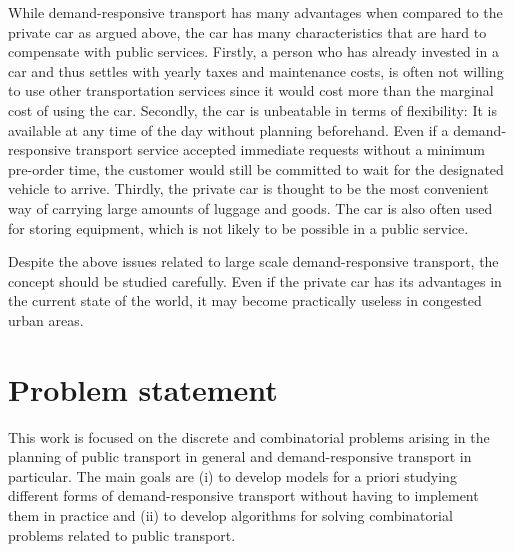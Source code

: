 \documentclass[dissertation,draft*]{aaltoseries}
\begin{document}
While demand-responsive transport has many advantages when compared to the private car as argued above,
the car has many characteristics that are hard to compensate with public services. 
Firstly, a person who has already invested in a car and thus settles with yearly taxes and
maintenance costs, is often not willing to use other transportation services since it would
cost more than the marginal cost of using the car.
Secondly, the car is unbeatable in terms of flexibility: 
It is available at any time of the day without planning beforehand. 
Even if a demand-responsive transport service accepted immediate requests without
a minimum pre-order time, the customer would still be committed to wait for the 
designated vehicle to arrive. Thirdly, the private car is thought to be the most convenient 
way of carrying large amounts of luggage and goods. The car is also often used for
storing equipment, which is not likely to be possible in a public service. 

Despite the above issues related to large scale 
demand-responsive transport, the concept should be studied carefully.
Even if the private car has its advantages in the current state of the world,
it may become practically useless in congested urban areas.

%
%
%
%
%
%
%
%
%
%
%
%
%

\section{Problem statement}
This work is focused on the discrete and combinatorial problems arising in the planning of
public transport in general and demand-responsive transport in particular. The main goals are (i) to develop models for a priori studying 
different forms of demand-responsive transport without having to implement them in practice and (ii) to
develop algorithms for solving combinatorial problems related to public transport.
\end{document}
